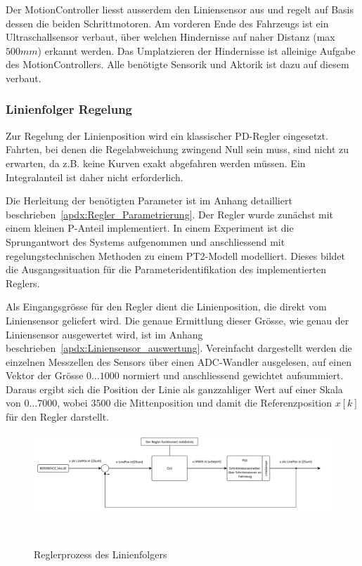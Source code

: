 \documentclass[main.tex]{subfiles} %
\begin{document}
Der MotionController liesst ausserdem den Liniensensor aus und regelt auf Basis
dessen die beiden Schrittmotoren. Am vorderen Ende des Fahrzeugs ist ein
Ultraschallsensor verbaut, über welchen Hindernisse auf naher Distanz (max $500
    mm$) erkannt werden. Das Umplatzieren der Hindernisse ist alleinige Aufgabe des
MotionControllers. Alle benötigte Sensorik und Aktorik ist dazu auf diesem
verbaut.

\subsubsection{Linienfolger Regelung}

Zur Regelung der Linienposition wird ein klassischer PD-Regler eingesetzt.
Fahrten, bei denen die Regelabweichung zwingend Null sein muss, sind nicht zu
erwarten, da z.B. keine Kurven exakt abgefahren werden müssen. Ein
Integralanteil ist daher nicht erforderlich.

Die Herleitung der benötigten Parameter ist im Anhang detailliert
beschrieben~\ref{apdx:Regler_Parametrierung}. Der Regler wurde zunächst mit
einem kleinen P-Anteil implementiert. In einem Experiment ist die Sprungantwort
des Systems aufgenommen und anschliessend mit regelungstechnischen Methoden zu
einem PT2-Modell modelliert. Dieses bildet die Ausgangssituation für die
Parameteridentifikation des implementierten Reglers.

Als Eingangsgrösse für den Regler dient die Linienposition, die direkt vom
Liniensensor geliefert wird. Die genaue Ermittlung dieser Grösse, wie genau der
Liniensensor ausgewertet wird, ist im Anhang
beschrieben~\ref{apdx:Liniensensor_auswertung}. Vereinfacht dargestellt werden
die einzelnen Messzellen des Sensors über einen ADC-Wandler ausgelesen, auf
einen Vektor der Grösse $0 \dots 1000$ normiert und anschliessend gewichtet
aufsummiert. Daraus ergibt sich die Position der Linie als ganzzahliger Wert
auf einer Skala von $0 \dots 7000$, wobei $3500$ die Mittenposition und damit
die Referenzposition $x[k]$ für den Regler darstellt.

\begin{figure}[H]
    \centering
    \includegraphics[width=1.0\linewidth]{../../Anhang_subfiles/Anhang_Elektronik/fig_Parametrierung_Linienfolgeregler/RegelProzess_Linienfolger.pdf}
    \caption{Reglerprozess des Linienfolgers}~\label{fig:Linienfolger_RegelProzess_ht}
\end{figure}
\end{document}
